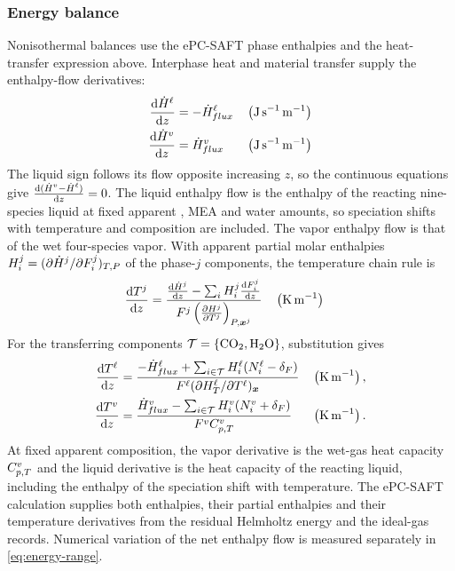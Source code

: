 \subsubsection{Energy balance}\label{subsubsec:energy-balance}
Nonisothermal balances use the ePC-SAFT phase enthalpies and the heat-transfer expression above.
Interphase heat and material transfer supply the enthalpy-flow derivatives:
\begin{align}
\odv{\enthalpyflow^{\liq}}{z} &= -\enthalpyflow^{\liq}_{flux} && \left(\unit{J\,s^{-1}\,m^{-1}}\right)\\
\odv{\enthalpyflow^{\vap}}{z} &= \enthalpyflow^{\vap}_{flux} && \left(\unit{J\,s^{-1}\,m^{-1}}\right)\label{eq:energy-balance}
\end{align}
The liquid sign follows its flow opposite increasing $z$, so the continuous equations give $\odv{(\enthalpyflow^{\vap}-\enthalpyflow^{\liq})}{z}=0$.
The liquid enthalpy flow is the enthalpy of the reacting nine-species liquid at fixed apparent \COtwo{}, MEA and water amounts, so speciation shifts with temperature and composition are included.
The vapor enthalpy flow is that of the wet four-species vapor.
With apparent partial molar enthalpies $H_i^j=(\partial\dot{H}^j/\partial F_i^j)_{T,P}$ of the phase-$j$ components, the temperature chain rule is
\begin{align}
\odv{\temperature^j}{z} &= \frac{\odv{\enthalpyflow^j}{z} - \sum_i H_i^j\odv{\molarflow_i^j}{z}}{\molarflow^j \left(\pdv{H^j}{\temperature^j}\right)_{P,\boldsymbol{x}^j}}
&& \left(\unit{K\,m^{-1}}\right)
\end{align}
For the transferring components \(\mathcal T=\{\COtwo,\HtwoO\}\), substitution gives
\begin{align}
\odv{\temperature^\liq}{z}
&=\frac{-\enthalpyflow^\liq_{flux}+\sum_{i\in\mathcal T}H_i^\liq(\molarflux_i^\liq-\delta_F)}
{\molarflow^\liq(\partial H_T^\liq/\partial T^\liq)_{\boldsymbol{x}}}
&&\left(\unit{K\,m^{-1}}\right),\\
\odv{\temperature^\vap}{z}
&=\frac{\enthalpyflow^\vap_{flux}-\sum_{i\in\mathcal T}H_i^\vap(\molarflux_i^\vap+\delta_F)}
{\molarflow^\vap C_{p,T}^\vap}
&&\left(\unit{K\,m^{-1}}\right).
\end{align}
At fixed apparent composition, the vapor derivative is the wet-gas heat capacity $C_{p,T}^{v}$ and the liquid derivative is the heat capacity of the reacting liquid, including the enthalpy of the speciation shift with temperature.
The ePC-SAFT calculation supplies both enthalpies, their partial enthalpies and their temperature derivatives from the residual Helmholtz energy and the ideal-gas records.
Numerical variation of the net enthalpy flow is measured separately in \cref{eq:energy-range}.

